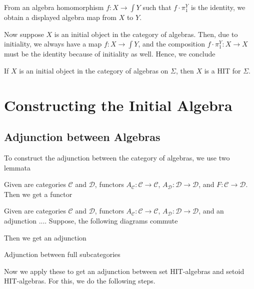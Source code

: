 \documentclass[9pt]{entcs}
\newcommand{\0}{\textbf{0}} %
\newcommand{\1}{\textbf{1}} %
\newcommand{\functor}[2]{#1 \longrightarrow #2} %
\newcommand{\comp}[2]{#1 \cdot #2} %
\newcommand{\total}[1]{\int #1} %
\newcommand{\proj}[1]{\pi_1^{#1}} %
\begin{document}
\begin{proposition}
From an algebra homomorphism $f : X \rightarrow \total{Y}$ such that $\comp{f}{\proj{Y}}$ is the identity, we obtain a displayed algebra map from $X$ to $Y$.
\end{proposition}

Now suppose $X$ is an initial object in the category of algebras.
Then, due to initiality, we always have a map $f : X \rightarrow \total{Y}$, and the composition $\comp{f}{\proj{Y}} : X \rightarrow X$ must be the identity because of initiality as well.
Hence, we conclude

\begin{corollary}
If $X$ is an initial object in the category of algebras on $\Sigma$, then $X$ is a HIT for $\Sigma$.
\end{corollary}

\section{Constructing the Initial Algebra}
\label{sec:construction}

\subsection{Adjunction between Algebras}
To construct the adjunction between the category of algebras, we use two lemmata

\begin{lemma}
Given are categories $\mathcal{C}$ and $\mathcal{D}$, functors $A_{\mathcal{C}} : \functor{\mathcal{C}}{\mathcal{C}}$, $A_{\mathcal{D}} : \functor{\mathcal{D}}{\mathcal{D}}$, and $F : \functor{\mathcal{C}}{\mathcal{D}}$.
Then we get a functor 
\end{lemma}

\begin{lemma}
Given are categories $\mathcal{C}$ and $\mathcal{D}$, functors $A_{\mathcal{C}} : \functor{\mathcal{C}}{\mathcal{C}}$, $A_{\mathcal{D}} : \functor{\mathcal{D}}{\mathcal{D}}$, and an adjunction ....
Suppose, the following diagrams commute

Then we get an adjunction
\end{lemma}

\begin{lemma}
Adjunction between full subcategories
\end{lemma}

Now we apply these to get an adjunction between set HIT-algebras and setoid HIT-algebras.
For this, we do the following steps.
\end{document}
